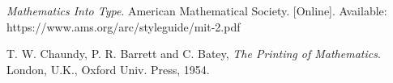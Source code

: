 \documentclass[lettersize,journal]{IEEEtran}
\begin{document}
\begin{thebibliography}{1}


{\it{Mathematics Into Type}}. American Mathematical Society. [Online]. Available: https://www.ams.org/arc/styleguide/mit-2.pdf

T. W. Chaundy, P. R. Barrett and C. Batey, {\it{The Printing of Mathematics}}. London, U.K., Oxford Univ. Press, 1954.

\end{thebibliography}


\newpage



\vfill
\end{document}
